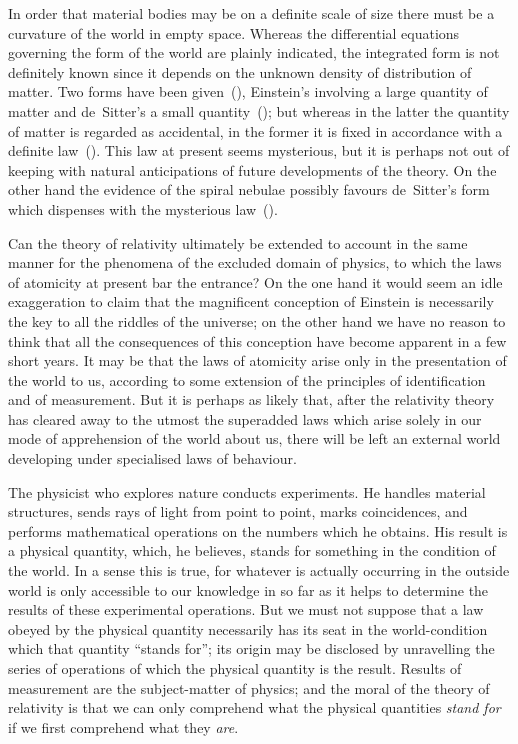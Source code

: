 \documentclass[12pt]{book}
\begin{document}
In order that material bodies may be on a definite scale of size there must
be a curvature of the world in empty space. Whereas the differential equations
governing the form of the world are plainly indicated, the integrated form is
not definitely known since it depends on the unknown density of distribution
of matter. Two forms have been given~(), Einstein's involving a large quantity
of matter and de~Sitter's a small quantity~(); but whereas in the latter the
quantity of matter is regarded as accidental, in the former it is fixed in accordance
with a definite law~(). This law at present seems mysterious, but it is
perhaps not out of keeping with natural anticipations of future developments
of the theory. On the other hand the evidence of the spiral nebulae possibly
favours de~Sitter's form which dispenses with the mysterious law~().

Can the theory of relativity ultimately be extended to account in the same
manner for the phenomena of the excluded domain of physics, to which the
laws of atomicity at present bar the entrance? On the one hand it would
seem an idle exaggeration to claim that the magnificent conception of Einstein
is necessarily the key to all the riddles of the universe; on the other hand we
have no reason to think that all the consequences of this conception have
become apparent in a few short years. It may be that the laws of atomicity
arise only in the presentation of the world to us, according to some extension
of the principles of identification and of measurement. But it is perhaps as
likely that, after the relativity theory has cleared away to the utmost the
superadded laws which arise solely in our mode of apprehension of the world
about us, there will be left an external world developing under specialised
laws of behaviour.

The physicist who explores nature conducts experiments. He handles
material structures, sends rays of light from point to point, marks coincidences,
and performs mathematical operations on the numbers which he obtains. His
result is a physical quantity, which, he believes, stands for something in the
condition of the world. In a sense this is true, for whatever is actually occurring
in the outside world is only accessible to our knowledge in so far as it
helps to determine the results of these experimental operations. But we must
not suppose that a law obeyed by the physical quantity necessarily has its seat
in the world\hyp{}condition which that quantity ``stands for''; its origin may be
disclosed by unravelling the series of operations of which the physical quantity
is the result. Results of measurement are the subject\hyp{}matter of physics; and
the moral of the theory of relativity is that we can only comprehend what the
physical quantities \emph{stand for} if we first comprehend what they \emph{are}.
\end{document}
